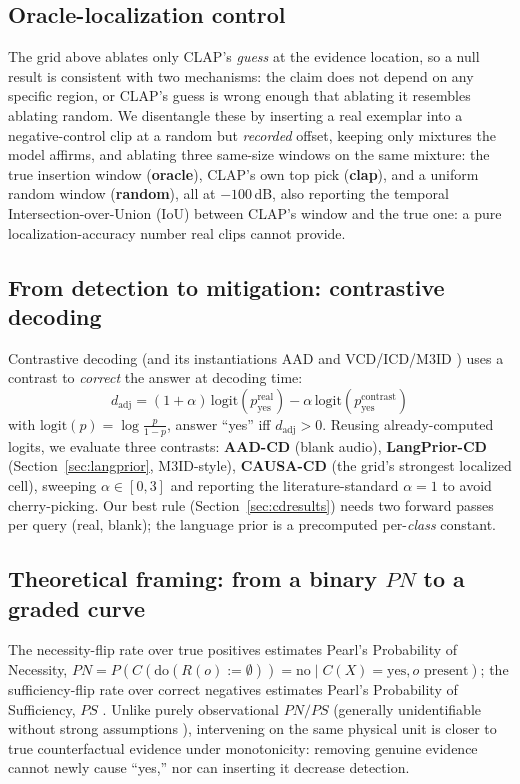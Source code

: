 \documentclass{article}
\begin{document}
\subsection{Oracle-localization control}\label{sec:oraclemethod}
The grid above ablates only CLAP's \emph{guess} at the evidence
location, so a null result is consistent with two mechanisms: the
claim does not depend on any specific region, or CLAP's guess is wrong
enough that ablating it resembles ablating random. We disentangle
these by inserting a real
exemplar into a negative-control clip at a random but \emph{recorded}
offset, keeping only mixtures the model affirms, and ablating three
same-size windows on the same mixture: the true insertion window
(\textbf{oracle}), CLAP's own top pick (\textbf{clap}), and a uniform
random window (\textbf{random}), all at $-100$\,dB, also reporting the
temporal Intersection-over-Union (IoU) between CLAP's window and the
true one: a pure localization-accuracy number real clips cannot
provide.

\subsection{From detection to mitigation: contrastive decoding}\label{sec:cd}
Contrastive decoding \cite{li2023contrastive} (and its instantiations
AAD \cite{hsu2025aad} and VCD/ICD/M3ID
\cite{leng2024vcd,icd2024,favero2024m3id}) uses a contrast to
\emph{correct} the answer at decoding time:
\begin{equation}
d_{\text{adj}} = (1+\alpha)\,\mathrm{logit}(p_{\text{yes}}^{\text{real}})
- \alpha\,\mathrm{logit}(p_{\text{yes}}^{\text{contrast}})
\end{equation}
with $\mathrm{logit}(p)=\log\frac{p}{1-p}$, answer ``yes'' iff
$d_{\text{adj}}>0$. Reusing already-computed logits, we evaluate three
contrasts: \textbf{AAD-CD} (blank audio), \textbf{LangPrior-CD}
(Section~\ref{sec:langprior}, M3ID-style), \textbf{CAUSA-CD} (the grid's
strongest localized cell), sweeping $\alpha\in[0,3]$ and reporting the
literature-standard $\alpha{=}1$ to avoid cherry-picking. Our best
rule (Section~\ref{sec:cdresults}) needs two forward passes per query
(real, blank); the language prior is a precomputed per-\emph{class}
constant.

\subsection{Theoretical framing: from a binary $PN$ to a graded curve}\label{sec:theory}
The necessity-flip rate over true positives estimates Pearl's
Probability of Necessity, $PN = P(C(\mathrm{do}(R(o){:=}\emptyset))=\text{no}
\mid C(X)=\text{yes}, o \text{ present})$; the sufficiency-flip rate over
correct negatives estimates Pearl's Probability of Sufficiency, $PS$
\cite{pearl2000causality,tian2000probabilities}.
Unlike purely observational $PN/PS$ (generally unidentifiable without
strong assumptions \cite{tian2000probabilities}), intervening on the
same physical unit is closer to true counterfactual evidence under
monotonicity: removing genuine evidence cannot newly cause ``yes,'' nor
can inserting it decrease detection.
\end{document}
